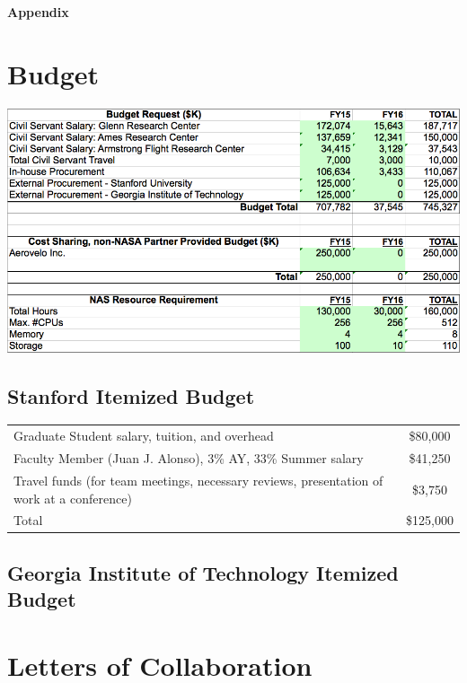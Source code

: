 \documentclass[]{aiaa-tc}
\begin{document}
  \clearpage
  

  

  \begin{landscape}
  \appendix
  \clearpage
  \centerline{\huge{\textbf{Appendix}}}
  \section{Budget}
    \centering
    \includegraphics[height=\textheight]{images/budget_request}
    \end{landscape}

  \subsection{Stanford Itemized Budget}
    \begin{table}\begin{tabular}{l|c}
    Graduate Student salary, tuition, and overhead &  \$80,000 \\
    Faculty Member (Juan J. Alonso), 3\% AY, 33\% Summer salary & \$41,250 \\
    Travel funds (for team meetings, necessary reviews, presentation of work at a conference) & \$3,750 \\
    \hline
    Total & \$125,000 \\ 
    \hline
    \end{tabular}\end{table}
  \subsection{Georgia Institute of Technology Itemized Budget}

  \clearpage

  \section{Letters of Collaboration}
\end{document}
